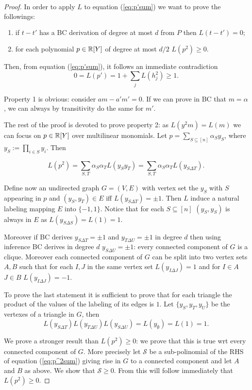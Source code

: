 \documentclass[a4paper,twoside,justified]{tufte-handout}
\begin{document}
\begin{proof}
In order to apply $L$ to equation (\ref{eq:p'sum}) we want to prove the followings:
\begin{enumerate}
\item if $t-t'$ has a BC derivation of degree at most $d$ from $P$ then $L(t-t')=0$;
\item for each polynomial $p\in \mathbb{R}[Y]$ of degree at most $d/2$ $L(p^2)\geq 0$.
\end{enumerate}
Then, from equation (\ref{eq:p'sum}), it follows an immediate contradiction 
$$
0=L(p')=1+\sum_jL(h_j^2)\geq 1.
$$

Property 1 is obvious: consider $a m -a' m'=0$. If we can prove in BC that $m=\alpha$, we can always by transitivity do the same for $m'$. 

The rest of the proof is devoted to prove property 2: as $L(y^2m)=L(m)$ we can focus on $p\in \mathbb{R}[Y]$ over multilinear monomials. Let $p=\sum_{S\subseteq [n]}\alpha_S y_S$, where $y_S:=\prod_{i\in S} y_i$. Then

\begin{equation}\label{eq:p^2sum}
L(p^2) =  \sum_{S,T} \alpha_S \alpha_T L( y_S y_T)=\sum_{S,T}\alpha_S \alpha_T L(y_{S \Delta T}).
\end{equation}

Define now an undirected graph $G=(V,E)$ with vertex set the $y_S$ with $S$ appearing in $p$ and $(y_S,y_T)\in E$ iff $L(y_{S\Delta T}) = \pm 1$. 
Then $L$ induce a natural labeling mapping $E$ into $\{-1,1\}$. 
Notice that for each $S\subseteq [n]$ $(y_S,y_S)$ is always in $E$ as $L(y_{S\Delta S})=L(1)=1$.

Moreover if BC derives $y_{S\Delta T} = \pm1$ and $y_{T\Delta U}=\pm 1$ in degree $d$ then using inference BC derives in degree $d$ $y_{S\Delta U} = \pm1$: every connected component of $G$ is a clique. 
Moreover each connected component of $G$ can be split into two vertex sets $A,B$ such that for each $I,J$ in the same vertex set $L(y_{I \Delta J})=1$ and for $I \in A$ $J\in B$ $L(y_{I \Delta J})=-1$.

To prove the last statement it is sufficient to prove that for each triangle the product of the values of the labeling of its edges is $1$. Let $\{y_S,y_T,y_U\}$ be the vertexes of a triangle in $G$, then
$$
L(y_{S\Delta T})L(y_{T\Delta U})L(y_{S\Delta U})=L(y_{\emptyset})=L(1)=1.
$$

We prove a stronger result than $L(p^2)\geq 0$: we prove that this is true wrt every connected component of $G$. More precisely let $\mathcal{S}$ be a sub-polinomial of the RHS of equation (\ref{eq:p^2sum}) giving rise in $G$ to a connected component and let $A$ and $B$ as above. We show that $\mathcal{S}\geq 0$. From this will follow immediately that $L(p^2)\geq 0$.


\end{proof}
\end{document}
